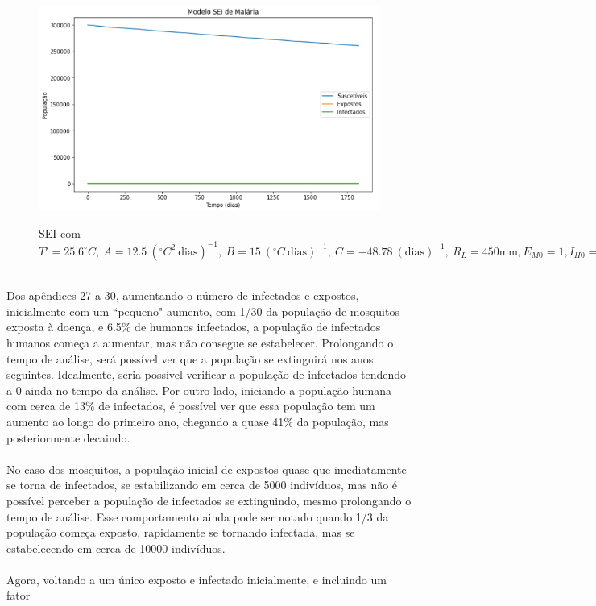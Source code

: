 \begin{figure}[!ht]
        \centering
        \hbox{\hspace{2.5em} \includegraphics[scale=0.7] {SEI_Entrada_Pop_1_1_Infect.png}}
        \caption{SEI com $T'=25.6 ^\circ C, \ A=12.5 \ (^\circ C^2 \ \text{dias})^{-1}, \ B=15 \ (^\circ C \ \text{dias})^{-1}, \ C=-48.78 \ (\text{dias})^{-1}, \ R_L=450 \text{mm}, E_{M0}=1, I_{H0}=1$} 
\end{figure} 
\\Dos apêndices 27 a 30, aumentando o número de infectados e expostos, inicialmente com um 
``pequeno" aumento, com 1/30 da população de mosquitos exposta à doença, e 6.5\% 
de humanos infectados, a população de infectados humanos começa a aumentar, 
mas não consegue se estabelecer. Prolongando o tempo de análise, será possível 
ver que a população se extinguirá nos anos seguintes. Idealmente, seria 
possível verificar a população de infectados tendendo a 0 ainda no tempo da 
análise. Por outro lado, iniciando a população humana com cerca de 13\% de infectados, 
é possível ver que essa população tem um aumento ao longo do primeiro ano, 
chegando a quase 41\% da população, mas posteriormente decaindo.
\\\\
No caso dos mosquitos, a população inicial de expostos quase que 
imediatamente se torna de infectados, se estabilizando em cerca de 5000 
indivíduos, mas não é possível perceber a população de infectados se 
extinguindo, mesmo prolongando o tempo de análise. Esse comportamento 
ainda pode ser notado quando 1/3 da população começa exposto, rapidamente 
se tornando infectada, mas se estabelecendo em cerca de 10000 indivíduos. 
\\\\
Agora, voltando a um único exposto e infectado inicialmente, e incluindo um fator
